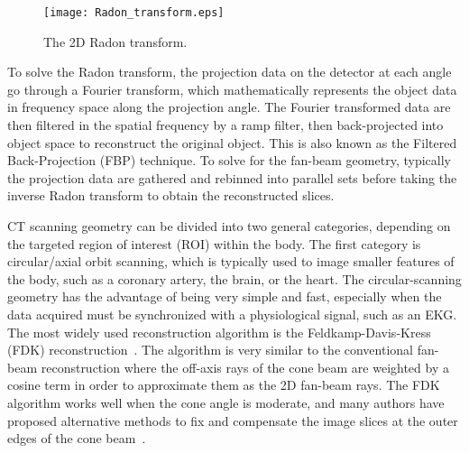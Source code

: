 \begin{figure}[h]
\centering
\texttt{[image: Radon\_transform.eps]}
\caption{The 2D Radon transform.}
\label{fig:RadonTransform}
\end{figure}
%
To solve the Radon transform, the projection data on the detector at each angle go through a Fourier transform, which mathematically represents the object data in frequency space along the projection angle.  The Fourier transformed data are then filtered in the spatial frequency by a ramp filter, then back-projected into object space to reconstruct the original object.  This is also known as the Filtered Back-Projection (FBP) technique.  To solve for the fan-beam geometry, typically the projection data are gathered and rebinned into parallel sets before taking the inverse Radon transform to obtain the reconstructed slices.

CT scanning geometry can be divided into two general categories, depending on the targeted region of interest (ROI) within the body.  The first category is circular/axial orbit scanning, which is typically used to image smaller features of the body, such as a coronary artery, the brain, or the heart.  The circular-scanning geometry has the advantage of being very simple and fast, especially when the data acquired must be synchronized with a physiological signal, such as an EKG.  The most widely used reconstruction algorithm is the Feldkamp-Davis-Kress (FDK) reconstruction~\citep{Feldkamp1984}.  The algorithm is very similar to the conventional fan-beam reconstruction where the off-axis rays of the cone beam are weighted by a cosine term in order to approximate them as the 2D fan-beam rays.  The FDK algorithm works well when the cone angle is moderate, and many authors have proposed alternative methods to fix and compensate the image slices at the outer edges of the cone beam~\citep{Katsevich2003, Chen2003, Hu1996}.

